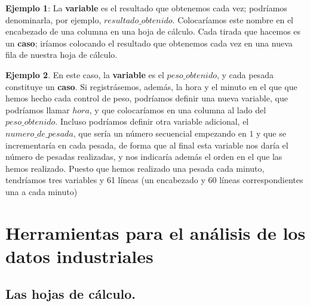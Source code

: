 \documentclass[
  letterpaper,
  DIV=11,
  numbers=noendperiod,
  oneside]{scrreprt}
\begin{document}
\begin{tcolorbox}[enhanced jigsaw, colback=white, opacitybacktitle=0.6, leftrule=.75mm, opacityback=0, coltitle=black, colframe=quarto-callout-tip-color-frame, colbacktitle=quarto-callout-tip-color!10!white, bottomrule=.15mm, title={Respuestas: Para resolver}, bottomtitle=1mm, toptitle=1mm, breakable, left=2mm, arc=.35mm, titlerule=0mm, rightrule=.15mm, toprule=.15mm]

\textbf{Ejemplo 1}: La \textbf{variable} es el resultado que obtenemos
cada vez; podríamos denominarla, por ejemplo, \(resultado\_obtenido\).
Colocaríamos este nombre en el encabezado de una columna en una hoja de
cálculo. Cada tirada que hacemos es un \textbf{caso}; iríamos colocando
el resultado que obtenemos cada vez en una nueva fila de nuestra hoja de
cálculo.

\textbf{Ejemplo 2}. En este caso, la \textbf{variable} es el
\(peso\_obtenido\), y cada pesada constituye un \textbf{caso}. Si
registrásemos, además, la hora y el minuto en el que que hemos hecho
cada control de peso, podríamos definir una nueva variable, que
podríamos llamar \(hora\), y que colocaríamos en una columna al lado del
\(peso\_obtenido\). Incluso podríamos definir otra variable adicional,
el \(numero\_de\_pesada\), que sería un número secuencial empezando en
\(1\) y que se incrementaría en cada pesada, de forma que al final esta
variable nos daría el número de pesadas realizadas, y nos indicaría
además el orden en el que las hemos realizado. Puesto que hemos
realizado una pesada cada minuto, tendríamos tres variables y 61 líneas
(un encabezado y 60 líneas correspondientes una a cada minuto)

\end{tcolorbox}


\hypertarget{herramientas-para-el-anuxe1lisis-de-los-datos-industriales}{%
\chapter{Herramientas para el análisis de los datos
industriales}\label{herramientas-para-el-anuxe1lisis-de-los-datos-industriales}}

\hypertarget{las-hojas-de-cuxe1lculo.}{%
\section{Las hojas de cálculo.}\label{las-hojas-de-cuxe1lculo.}}
\end{document}
